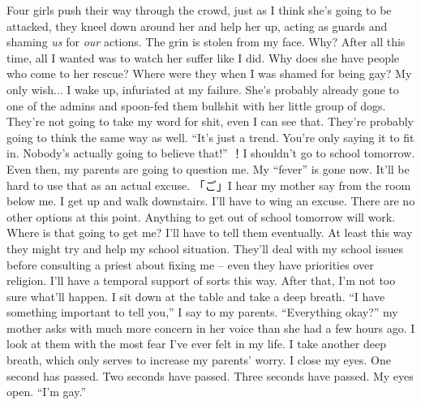 \documentclass[a4paper, 12pt]{book}
\begin{document}
\begin{CJK*}{UTF8}{min}
\tab
Four girls push their way through the crowd, just as I think she’s going to be attacked, they kneel down around her and help her up, acting as guards and shaming \textit{us} for \textit{our} actions. The grin is stolen from my face. Why? After all this time, all I wanted was to watch her suffer like I did. Why does she have people who come to her rescue? Where were they when I was shamed for being gay? My only wish...
\newline
\tab
I wake up, infuriated at my failure. She’s probably already gone to one of the admins and spoon-fed them bullshit with her little group of dogs. They’re not going to take my word for shit, even I can see that. They’re probably going to think the same way as well. ``It’s just a trend. You’re only saying it to fit in. Nobody’s actually going to believe that!'' ！I shouldn’t go to school tomorrow. Even then, my parents are going to question me. My ``fever'' is gone now. It’ll be hard to use that as an actual excuse.
\newline
\tab
「ご」I hear my mother say from the room below me. I get up and walk downstairs. I’ll have to wing an excuse. There are no other options at this point. Anything to get out of school tomorrow will work. Where is that going to get me? I’ll have to tell them eventually. At least this way they might try and help my school situation. They’ll deal with my school issues before consulting a priest about fixing me -- even they have priorities over religion. I’ll have a temporal support of sorts this way. After that, I’m not too sure what’ll happen.
\newline
\tab
I sit down at the table and take a deep breath. ``I have something important to tell you,'' I say to my parents.
\newline
\tab
``Everything okay?'' my mother asks with much more concern in her voice than she had a few hours ago. 
\newline
\tab
I look at them with the most fear I’ve ever felt in my life. I take another deep breath, which only serves to increase my parents’ worry. I close my eyes. One second has passed. Two seconds have passed. Three seconds have passed. My eyes open. ``I’m gay.''
\end{CJK*}
\end{document}
